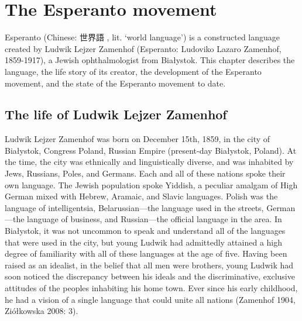 \chapter{The Esperanto movement}

Esperanto (Chinese: 世界語 , lit. `world language') is a constructed language created by Ludwik Lejzer Zamenhof (Esperanto: Ludoviko Lazaro Zamenhof, 1859-1917), a Jewish ophthalmologist from Białystok.
This chapter describes the language, the life story of its creator, the development of the Esperanto movement, and the state of the Esperanto movement to date.

\section{The life of Ludwik Lejzer Zamenhof}
Ludwik Lejzer Zamenhof was born on December 15th, 1859, in the city of Białystok, Congress Poland, Russian Empire (present-day Białystok, Poland).
At the time, the city was ethnically and linguistically diverse, and was inhabited by Jews, Russians, Poles, and Germans.
Each and all of these nations spoke their own language.
The Jewish population spoke Yiddish, a peculiar amalgam of High German mixed with Hebrew, Aramaic, and Slavic languages. Polish was the language of intelligentsia, Belarussian---the language used in the streets, German---the language of business, and Russian---the official language in the area.
In Białystok, it was not uncommon to speak and understand all of the languages that were used in the city, but young Ludwik had admittedly attained a high degree of familiarity with all of these languages at the age of five.
Having been raised as an idealist, in the belief that all men were brothers, young Ludwik had soon noticed the discrepancy between his ideals and the discriminative, exclusive attitudes of the peoples inhabiting his home town.
Ever since his early childhood, he had a vision of a single language that could unite all nations (Zamenhof 1904, Ziółkowska 2008: 3).

